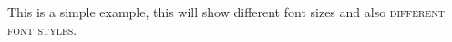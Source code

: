 This is a simple example, 
{\tiny this will show different font sizes} 
and also \textsc{different font styles}.
